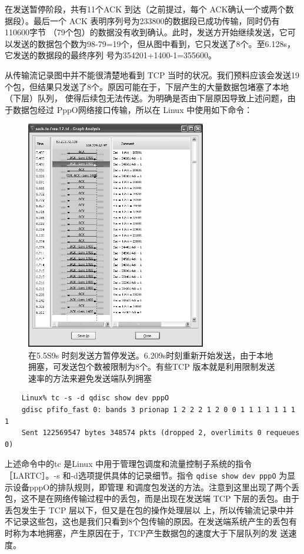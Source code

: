 在发送暂停阶段，共有11个ACK 到达（之前提过，每个 ACK确认一个或两个数据段）。最后一个 ACK 表明序列号为233800的数据段已成功传输，同时仍有110600字节
（79个包）的数据没有收到确认。此时，发送方开始继续发送，它可以发送的数据包个数为98-79=19个，但从图中看到，它只发送了8个。至6.128s，它发送的数据段的最终序列
号为354201+1400-1=355600。

从传输流记录图中并不能很清楚地看到 TCP 当时的状况。我们预料应该会发送19个包，但结果只发送了8个。原因可能在于，下层产生的大量数据包堵塞了本地（下层）队列，
使得后续包无法传送。为明确是否由下层原因导致上述问题，由于数据包经过 PppO网络接口传输，所以在 Linux 中使用如下命令：
\begin{figure}[!htb]
    \centering
	\includegraphics[width=0.7\textwidth]{imgs/16/16-7.png}
	\caption{在5.5S9s 时刻发送方暂停发送。6.209s时刻重新开始发送，由于本地拥塞，可发送包个数被限制为8个。有些TCP 版本就是利用限制发送速率的方法来避免发送端队列拥塞}
\end{figure}

\begin{verbatim}
    Linux% tc -s -d qdisc show dev pppO
    gdisc pfifo_fast 0: bands 3 prionap 1 2 2 2 1 2 0 0 1 1 1 1 1 1 1 1
    Sent 122569547 bytes 348574 pkts (dropped 2, overlimits 0 requeues 0)
\end{verbatim}

上述命令中的tc 是Linux 中用于管理包调度和流量控制子系统的指令［LARTC］。-s 和-d选项提供具体的记录细节。指令 \verb|qdise show dev pppO| 为显示设备pppO的排队规则，即管理
和调度包发送的方法。注意到这里出现了两个丢包，这不是在网络传输过程中的丢包，而是出现在发送端 TCP 下层的丢包。由于丢包发生于 TCP 层以下，但又是在包的操作处理层以
上，所以传输流记录中并不记录这些包，这也是我们只看到8个包传输的原因。在发送端系统产生的丢包有时称为本地拥塞，产生原因在于，TCP产生数据包的速度大于下层队列的发
送速度。

